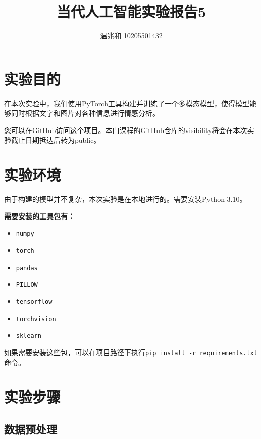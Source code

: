 \documentclass{article}
\title{当代人工智能实验报告5}
\author{温兆和 10205501432}
\begin{document}
\maketitle

\section{实验目的}
在本次实验中，我们使用PyTorch工具构建并训练了一个多模态模型，使得模型能够同时根据文字和图片对各种信息进行情感分析。

您可以\href{https://github.com/WeiLeGeZhi/Contemporary-Artificial-Intelligence/tree/main/lab%205}{在GitHub访问这个项目}。本门课程的GitHub仓库的visibility将会在本次实验截止日期抵达后转为public。

\section{实验环境}
由于构建的模型并不复杂，本次实验是在本地进行的。需要安装Python 3.10。

\textbf{需要安装的工具包有：}
\begin{spacing}{0.5}
\begin{itemize}
\item \lstinline|numpy|
\item \lstinline|torch|
\item \lstinline|pandas|
\item \lstinline|PILLOW|
\item \lstinline|tensorflow|
\item \lstinline|torchvision|
\item \lstinline|sklearn|
\end{itemize}
\end{spacing}

如果需要安装这些包，可以在项目路径下执行\lstinline|pip install -r requirements.txt|命令。
\section{实验步骤}
\subsection{数据预处理}
\end{document}

